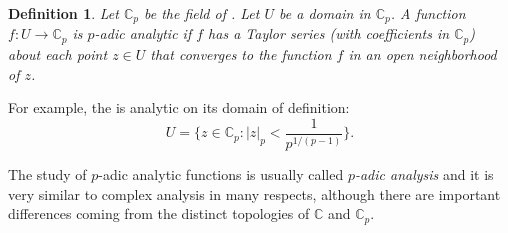 \documentclass[12pt]{article}
\newtheorem*{defn}{Definition}
\theoremstyle{definition}
\newcommand{\Complex}{\mathbb{C}}
\begin{document}
\begin{defn}
Let $\Complex_p$ be the field of . Let $U$ be a domain in $\Complex_p$. A function $f: U \longrightarrow \Complex_p$  is {\em $p$-adic analytic}  if $f$ has a Taylor series (with coefficients in $\Complex_p$) about each point $z \in U$ that converges to the function $f$ in an open neighborhood of $z$.
\end{defn}

For example, the  is analytic on its domain of definition:
$$U=\{ z\in \Complex_p : |z|_p<\frac{1}{p^{1/(p-1)}}\}.$$

The study of $p$-adic analytic functions is usually called {\em $p$-adic analysis} and it is very similar to complex analysis in many respects, although there are important differences coming from the distinct topologies of $\Complex$ and $\Complex_p$.
\end{document}
